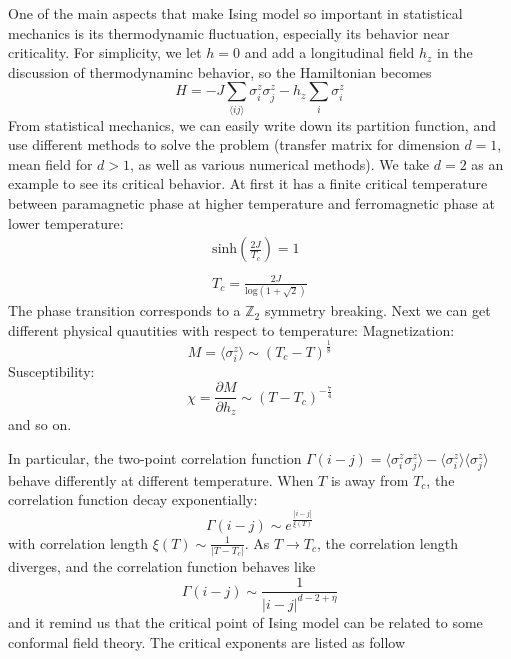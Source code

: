 \documentclass[12pt]{article}
\begin{document}
One of the main aspects that make Ising model so important in statistical mechanics is its thermodynamic fluctuation, especially its behavior near criticality. For simplicity, we let $h=0$ and add a longitudinal field $h_z$ in the  discussion of thermodynaminc behavior, so the Hamiltonian becomes
\begin{equation}
		H=-J\sum_{\langle ij\rangle}\sigma^z_i\sigma^z_j-h_z\sum_i\sigma_i^z
\end{equation}
From statistical mechanics, we can easily write down its partition function, and use different methods to solve the problem (transfer matrix for dimension $d=1$, mean field for $d>1$, as well as various numerical methods). We take $d=2$ as an example to see its critical behavior. At first it has a finite critical temperature between paramagnetic phase at higher temperature and ferromagnetic phase at lower temperature:
\begin{equation}
\begin{align}
	\mathrm{sinh}\left(\frac{2J}{T_c}\right)=1\\
	\\
	T_c=\frac{2J}{\mathrm{log}(1+\sqrt{2})}
\end{align} 
\end{equation}
The phase transition corresponds to a $\mathbb{Z}_2$ symmetry breaking. Next we can get different physical quautities with respect to temperature:
Magnetization:
\begin{equation}
	M=\langle\sigma_i^z\rangle\sim(T_c-T)^{\frac{1}{8}}
\end{equation}
Susceptibility:
\begin{equation}
	\chi=\frac{\partial M}{\partial h_z}\sim(T-T_c)^{-\frac{7}{4}}
\end{equation}
and so on. 

In particular, the two-point correlation function $\Gamma(i-j)=\langle\sigma_i^z\sigma_j^z\rangle-\langle\sigma_i^z\rangle\langle\sigma_j^z\rangle$ behave differently at different temperature. When $T$ is away from $T_c$, the correlation function decay exponentially:
\begin{equation}
	\Gamma(i-j)\sim e^{\frac{|i-j|}{\xi(T)}}
\end{equation}
with correlation length $\xi(T)\sim\frac{1}{|T-T_c|}$. As $T\rightarrow T_c$, the correlation length diverges, and the correlation function behaves like
\begin{equation}
	\Gamma(i-j)\sim\frac{1}{|i-j|^{d-2+\eta}}
\end{equation}
and it remind us that the critical point of Ising model can be related to some conformal field theory. The critical exponents are listed as follow
\end{document}
